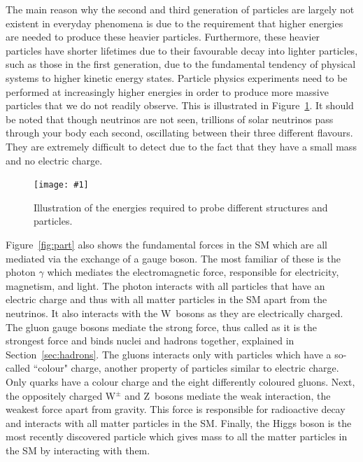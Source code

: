 \documentclass[twocolumn]{article}
\newcommand{\insertFigure}[1]{%
   \texttt{[image: \#1]}%
}
\begin{document}
The main reason why the second and third generation of particles are largely not existent in everyday phenomena is due to the requirement that higher energies are needed to produce these heavier particles. Furthermore, these heavier particles have shorter lifetimes due to their favourable decay into lighter particles, such as those in the first generation, due to the fundamental tendency of physical systems to higher kinetic energy states. Particle physics experiments need to be performed at increasingly higher energies in order to produce more massive particles that we do not readily observe. This is illustrated in Figure~\ref{fig:energy}. It should be noted that though neutrinos are not seen, trillions of solar neutrinos pass through your body each second, oscillating between their three different flavours.~\cite{Thompson} They are extremely difficult to detect due to the fact that they have a small mass and no electric charge. \\
\begin{figure}[!h]
	\centering
	\insertFigure{Images/energy.png}
	\caption{Illustration of the energies required to probe different structures and particles.~\cite{Thompson}}
	\label{fig:energy}
\end{figure}
\par Figure~\ref{fig:part} also shows the fundamental forces in the SM which are all mediated via the exchange of a gauge boson. The most familiar of these is the photon $\gamma$ which mediates the electromagnetic force, responsible for electricity, magnetism, and light. The photon interacts with all particles that have an electric charge and thus with all matter particles in the SM apart from the neutrinos. It also interacts with the W~bosons as they are electrically charged. The gluon gauge bosons mediate the strong force, thus called as it is the strongest force and binds nuclei and hadrons together, explained in Section~\ref{sec:hadrons}. The gluons interacts only with particles which have a so-called ``colour" charge, another property of particles similar to electric charge. Only quarks have a colour charge and the eight differently coloured gluons. Next, the oppositely charged W$^{\pm}$ and Z~bosons mediate the weak interaction, the weakest force apart from gravity. This force is responsible for radioactive decay and interacts with all matter particles in the SM. Finally, the Higgs boson is the most recently discovered particle which gives mass to all the matter particles in the SM by interacting with them.
\end{document}
